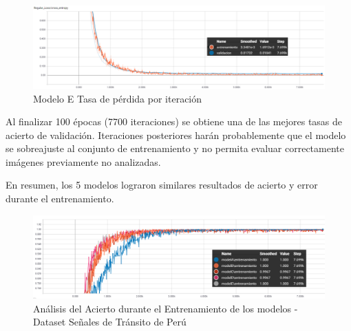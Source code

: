 			\begin{figure}[H]
				\begin{center}
				\includegraphics[width=1\textwidth]{images/desarrollo/trainResults/peru/model7Loss} 
				\end{center}
				\begin{center}
				\caption{\small{Modelo E Tasa de pérdida por iteración}}
				
				{\small{\fontsize{10}{16.8}\selectfont {Fuente: Elaboración propia}}}
				\end{center}
				\vspace{-1.5em}
			\end{figure}
		
			Al finalizar 100 épocas (7700 iteraciones) se obtiene una de las mejores tasas de acierto de validación. Iteraciones posteriores harán probablemente que el modelo se sobreajuste al conjunto de entrenamiento y no permita evaluar correctamente imágenes previamente no analizadas.


		\newpage
		En resumen, los 5 modelos lograron similares resultados de acierto y error durante el entrenamiento. 

			\begin{figure}[H]
				\includegraphics[width=1\textwidth, height=\textheight,keepaspectratio]{images/desarrollo/trainResults/peruSummary_entreAcierto} 
				\begin{center}
				\caption{\small{Análisis del Acierto durante el Entrenamiento de los modelos - Dataset Señales de Tránsito de Perú}}
				
				{\small{\fontsize{10}{16.8}\selectfont {Fuente: Elaboración propia}}}
				\end{center}
				\vspace{-1.5em}
			\end{figure}	

